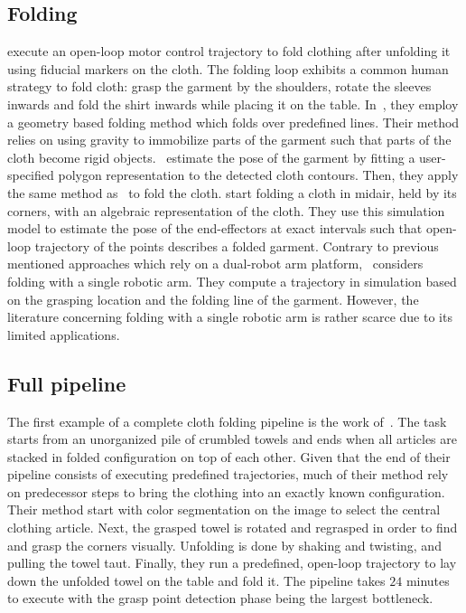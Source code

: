 \subsection{Folding}
\Textcite{Bersch2011} execute an open-loop motor control trajectory to fold clothing after unfolding it using fiducial markers on the cloth. The folding loop exhibits a common human strategy to fold cloth: grasp the garment by the shoulders, rotate the sleeves inwards and fold the shirt inwards while placing it on the table. In~\autocite{Berg2010}, they employ a geometry based folding method which folds over predefined lines. Their method relies on using gravity to immobilize parts of the garment such that parts of the cloth become rigid objects.~\autocite{Miller2012} estimate the pose of the garment by fitting a user-specified polygon representation to the detected cloth contours. Then, they apply the same method as~\autocite{Berg2010} to fold the cloth. \Autocite{Yamakawa2011} start folding a cloth in midair, held by its corners, with an algebraic representation of the cloth. They use this simulation model to estimate the pose of the end-effectors at exact intervals such that open-loop trajectory of the points describes a folded garment. Contrary to previous mentioned approaches which rely on a dual-robot arm platform,~\autocite{Petrik2017} considers folding with a single robotic arm. They compute a trajectory in simulation based on the grasping location and the folding line of the garment. However, the literature concerning folding with a single robotic arm is rather scarce due to its limited applications.

\subsection{Full pipeline}
The first example of a complete cloth folding pipeline is the work of~\textcite{Maitin2010}. The task starts from an unorganized pile of crumbled towels and ends when all articles are stacked in folded configuration on top of each other. Given that the end of their pipeline consists of executing predefined trajectories, much of their method rely on predecessor steps to bring the clothing into an exactly known configuration. Their method start with color segmentation on the image to select the central clothing article. Next, the grasped towel is rotated and regrasped in order to find and grasp the corners visually. Unfolding is done by shaking and twisting, and pulling the towel taut. Finally, they run a predefined, open-loop trajectory to lay down the unfolded towel on the table and fold it. The pipeline takes $24$ minutes to execute with the grasp point detection phase being the largest bottleneck.

